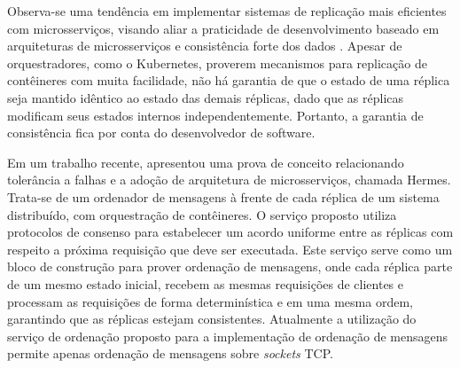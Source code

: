 Observa-se uma tendência em implementar sistemas de replicação mais eficientes com microsserviços, visando 
aliar a praticidade de desenvolvimento baseado em arquiteturas de microsserviços e consistência forte dos dados \cite{toffetti2015architecture}. 
%
Apesar de orquestradores, como o Kubernetes, proverem mecanismos para replicação de
contêineres com muita facilidade, 
não há garantia de que o estado de uma réplica seja mantido idêntico ao estado 
das demais réplicas,
dado que as réplicas modificam seus estados internos independentemente. 
Portanto, a
garantia de consistência fica por conta do desenvolvedor de software. 




Em um
trabalho recente,
\textcite{renan2021hermes}
apresentou uma prova de conceito
relacionando tolerância a falhas e a adoção de arquitetura de microsserviços, chamada Hermes. Trata-se de um ordenador de mensagens à frente de cada réplica de um sistema distribuído, com orquestração de contêineres.
O serviço proposto utiliza 
protocolos de consenso 
para estabelecer um acordo uniforme entre as réplicas com respeito 
a próxima requisição que deve ser executada. %
Este serviço serve como um bloco de construção para prover ordenação de mensagens, onde cada réplica parte de um mesmo estado inicial, recebem as mesmas requisições de clientes e processam as requisições de forma determinística e em uma mesma ordem, garantindo que as réplicas estejam consistentes.
Atualmente a utilização do serviço de ordenação proposto para a implementação de ordenação de mensagens permite apenas ordenação de mensagens sobre \textit{sockets} TCP.

